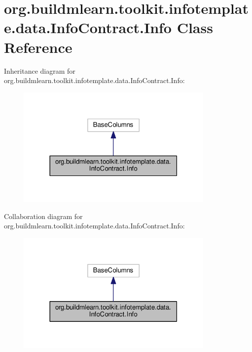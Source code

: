 \hypertarget{classorg_1_1buildmlearn_1_1toolkit_1_1infotemplate_1_1data_1_1InfoContract_1_1Info}{}\section{org.\+buildmlearn.\+toolkit.\+infotemplate.\+data.\+Info\+Contract.\+Info Class Reference}
\label{classorg_1_1buildmlearn_1_1toolkit_1_1infotemplate_1_1data_1_1InfoContract_1_1Info}


Inheritance diagram for org.\+buildmlearn.\+toolkit.\+infotemplate.\+data.\+Info\+Contract.\+Info\+:
\nopagebreak
\begin{figure}[H]
\begin{center}
\leavevmode
\includegraphics[width=273pt]{classorg_1_1buildmlearn_1_1toolkit_1_1infotemplate_1_1data_1_1InfoContract_1_1Info__inherit__graph}
\end{center}
\end{figure}


Collaboration diagram for org.\+buildmlearn.\+toolkit.\+infotemplate.\+data.\+Info\+Contract.\+Info\+:
\nopagebreak
\begin{figure}[H]
\begin{center}
\leavevmode
\includegraphics[width=273pt]{classorg_1_1buildmlearn_1_1toolkit_1_1infotemplate_1_1data_1_1InfoContract_1_1Info__coll__graph}
\end{center}
\end{figure}
